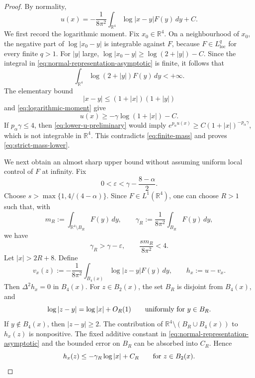\documentclass[11pt]{article}
\numberwithin{equation}{section}
\begin{document}
\begin{proof}
By normality,
\begin{equation}\label{eq:normal-representation-asymptotic}
u(x)=-\frac{1}{8\pi^{2}}
\int_{\mathbb R^{4}}\log|x-y|F(y)\,dy+C.
\end{equation}
We first record the logarithmic moment. Fix \(x_{0}\in\mathbb R^{4}\). On a neighbourhood of \(x_{0}\), the negative part of \(\log|x_{0}-y|\) is integrable against \(F\), because \(F\in L^{q}_{\operatorname{loc}}\) for every finite \(q>1\). For \(|y|\) large,
\(\log|x_{0}-y|\geq\log(2+|y|)-C\). Since the integral in \eqref{eq:normal-representation-asymptotic} is finite, it follows that
\begin{equation}\label{eq:logarithmic-moment}
\int_{\mathbb R^{4}}\log(2+|y|)F(y)\,dy<+\infty.
\end{equation}
The elementary bound
\[
|x-y|\leq(1+|x|)(1+|y|)
\]
and \eqref{eq:logarithmic-moment} give
\begin{equation}\label{eq:lower-u-preliminary}
u(x)\geq-\gamma\log(1+|x|)-C.
\end{equation}
If \(p_{\alpha}\gamma\leq4\), then \eqref{eq:lower-u-preliminary} would imply
\(e^{p_{\alpha}u(x)}\geq C(1+|x|)^{-p_{\alpha}\gamma}\), which is not integrable in \(\mathbb R^{4}\). This contradicts \eqref{eq:finite-mass} and proves \eqref{eq:strict-mass-lower}.

We next obtain an almost sharp upper bound without assuming uniform local control of \(F\) at infinity. Fix
\begin{equation}\label{eq:epsilon-choice-asymptotic}
0<\varepsilon<\gamma-\frac{8-\alpha}{2}.
\end{equation}
Choose \(s>\max\{1,4/(4-\alpha)\}\). Since \(F\in L^{1}(\mathbb R^{4})\), one can choose \(R>1\) such that, with
\[
m_{R}:=\int_{\mathbb R^{4}\setminus B_{R}}F(y)\,dy,
\qquad
\gamma_{R}:=\frac{1}{8\pi^{2}}\int_{B_{R}}F(y)\,dy,
\]
we have
\begin{equation}\label{eq:tail-small-choice}
\gamma_{R}>\gamma-\varepsilon,
\qquad
\frac{s m_{R}}{8\pi^{2}}<4.
\end{equation}
Let \(|x|>2R+8\). Define
\[
v_{x}(z):=-\frac{1}{8\pi^{2}}
\int_{B_{4}(x)}\log|z-y|F(y)\,dy,
\qquad
h_{x}:=u-v_{x}.
\]
Then \(\Delta^{2}h_{x}=0\) in \(B_{4}(x)\). For \(z\in B_{2}(x)\), the set \(B_{R}\) is disjoint from \(B_{4}(x)\), and
\[
\log|z-y|=\log|x|+O_{R}(1)
\qquad\hbox{uniformly for }y\in B_{R}.
\]
If \(y\notin B_{4}(x)\), then \(|z-y|\geq2\). The contribution of
\(\mathbb R^{4}\setminus(B_{R}\cup B_{4}(x))\) to \(h_x(z)\) is
nonpositive. The fixed additive constant in \eqref{eq:normal-representation-asymptotic}
and the bounded error on \(B_R\) can be absorbed into \(C_R\). Hence
\begin{equation}\label{eq:hx-upper}
h_{x}(z)\leq-\gamma_{R}\log|x|+C_{R}
\qquad\hbox{for }z\in B_{2}(x).
\end{equation}


\end{proof}
\end{document}
